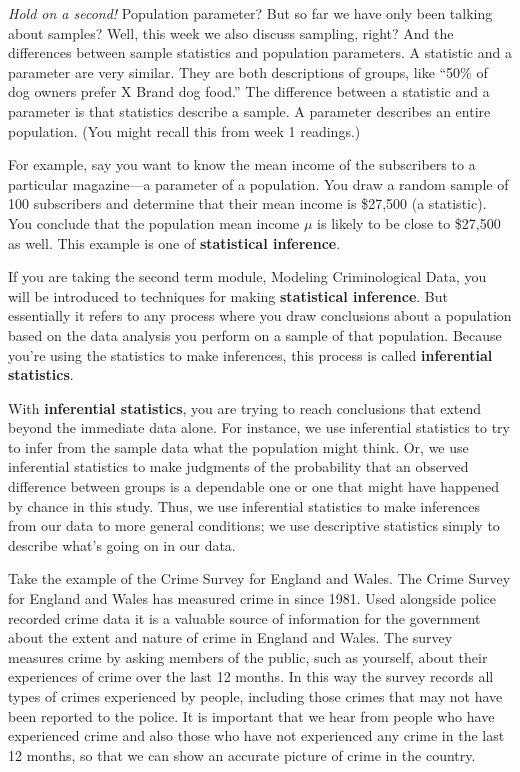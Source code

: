\documentclass[
]{book}
\begin{document}
\emph{Hold on a second!} Population parameter? But so far we have only been talking about samples? Well, this week we also discuss sampling, right? And the differences between sample statistics and population parameters. A statistic and a parameter are very similar. They are both descriptions of groups, like ``50\% of dog owners prefer X Brand dog food.'' The difference between a statistic and a parameter is that statistics describe a sample. A parameter describes an entire population. (You might recall this from week 1 readings.)

For example, say you want to know the mean income of the subscribers to a particular magazine---a parameter of a population. You draw a random sample of 100 subscribers and determine that their mean income is \$27,500 (a statistic). You conclude that the population mean income \(μ\) is likely to be close to \$27,500 as well. This example is one of \textbf{statistical inference}.

If you are taking the second term module, Modeling Criminological Data, you will be introduced to techniques for making \textbf{statistical inference}. But essentially it refers to any process where you draw conclusions about a population based on the data analysis you perform on a sample of that population. Because you're using the statistics to make inferences, this process is called \textbf{inferential statistics}.

With \textbf{inferential statistics}, you are trying to reach conclusions that extend beyond the immediate data alone. For instance, we use inferential statistics to try to infer from the sample data what the population might think. Or, we use inferential statistics to make judgments of the probability that an observed difference between groups is a dependable one or one that might have happened by chance in this study. Thus, we use inferential statistics to make inferences from our data to more general conditions; we use descriptive statistics simply to describe what's going on in our data.

Take the example of the Crime Survey for England and Wales. The Crime Survey for England and Wales has measured crime in since 1981. Used alongside police recorded crime data it is a valuable source of information for the government about the extent and nature of crime in England and Wales. The survey measures crime by asking members of the public, such as yourself, about their experiences of crime over the last 12 months. In this way the survey records all types of crimes experienced by people, including those crimes that may not have been reported to the police. It is important that we hear from people who have experienced crime and also those who have not experienced any crime in the last 12 months, so that we can show an accurate picture of crime in the country.
\end{document}

